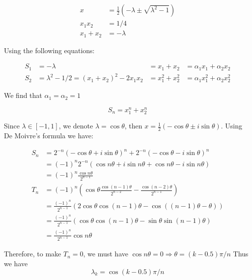\documentclass{article}
\begin{document}
\begin{description}
	      \begin{align*}
		      x         & = \frac{1}{2}(-\lambda \pm \sqrt{\lambda^2 - 1}) \\
		      x_1x_2    & = 1/4                                            \\
		      x_1 + x_2 & = -\lambda
	      \end{align*}

	      Using the following equations:

	      \begin{align*}
		      S_1 & = -\lambda                                  & = x_1 + x_2     & = \alpha_1 x_1 + \alpha_2 x_2     \\
		      S_2 & = \lambda^2 - 1/2 = (x_1 + x_2)^2 - 2x_1x_2 & = x_1^2 + x_2^2 & = \alpha_1 x_1^2 + \alpha_2 x_2^2
	      \end{align*}

	      We find that $\alpha_1 = \alpha_2 = 1$

	      $$S_n = x_1^n + x_2^n$$

	      Since $\lambda \in [-1, 1]$, we denote $\lambda = \cos \theta$, then $x = \frac{1}{2} (-\cos \theta \pm i \sin \theta)$. Using De Moivre's formula we have:

	      \begin{align*}
		      S_n & = 2^{-n} (-\cos \theta + i \sin \theta)^n + 2^{-n} (-\cos \theta - i \sin \theta)^n         \\
		          & = (-1)^n2^{-n}(\cos n\theta + i \sin n\theta + \cos n\theta - i \sin n\theta)               \\
		          & = (-1)^n\frac{\cos n\theta}{2^{n-1}}                                                        \\
		      T_n & = (-1)^{n}(\cos \theta \frac{\cos (n-1)\theta}{2^{n-2}} - \frac{\cos (n-2)\theta}{2^{n-1}}) \\
		          & = \frac{(-1)^{n}}{2^{n-1}}(2 \cos \theta \cos (n-1)\theta - \cos ((n-1)\theta - \theta))    \\
		          & = \frac{(-1)^{n}}{2^{n-1}}(\cos \theta \cos (n-1)\theta - \sin \theta \sin (n-1)\theta)     \\
		          & = \frac{(-1)^{n}}{2^{n-1}} \cos n\theta
	      \end{align*}

	      Therefore, to make $T_n = 0$, we must have $\cos n\theta = 0 \Rightarrow \theta = (k - 0.5)\pi / n$
	      Thus we have
	      $$\lambda_k = \cos (k - 0.5)\pi / n$$


\end{description}
\end{document}
